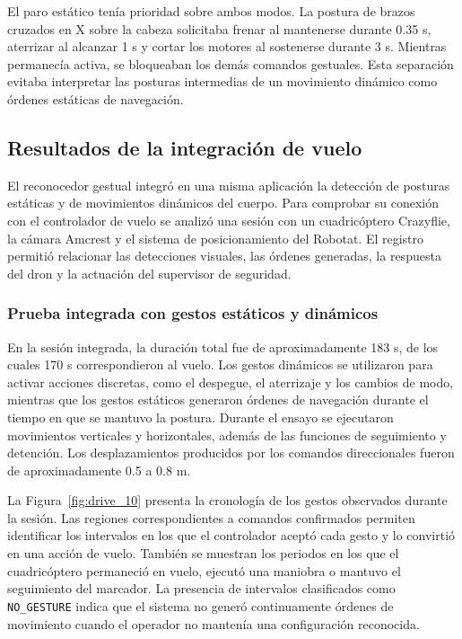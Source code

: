 El paro estático tenía prioridad sobre ambos modos. La postura de brazos cruzados en X sobre la cabeza solicitaba frenar al mantenerse durante 0.35 s, aterrizar al alcanzar 1 s y cortar los motores al sostenerse durante 3 s. Mientras permanecía activa, se bloqueaban los demás comandos gestuales. Esta separación evitaba interpretar las posturas intermedias de un movimiento dinámico como órdenes estáticas de navegación.

\subsection{Resultados de la integración de vuelo}

El reconocedor gestual integró en una misma aplicación la detección de posturas estáticas y de movimientos dinámicos del cuerpo. Para comprobar su conexión con el controlador de vuelo se analizó una sesión con un cuadricóptero Crazyflie, la cámara Amcrest y el sistema de posicionamiento del Robotat. El registro permitió relacionar las detecciones visuales, las órdenes generadas, la respuesta del dron y la actuación del supervisor de seguridad.

\subsubsection*{Prueba integrada con gestos estáticos y dinámicos}

En la sesión integrada, la duración total fue de aproximadamente 183 s, de los cuales 170 s correspondieron al vuelo. Los gestos dinámicos se utilizaron para activar acciones discretas, como el despegue, el aterrizaje y los cambios de modo, mientras que los gestos estáticos generaron órdenes de navegación durante el tiempo en que se mantuvo la postura. Durante el ensayo se ejecutaron movimientos verticales y horizontales, además de las funciones de seguimiento y detención. Los desplazamientos producidos por los comandos direccionales fueron de aproximadamente 0.5 a 0.8 m.

La Figura~\ref{fig:drive_10} presenta la cronología de los gestos observados durante la sesión. Las regiones correspondientes a comandos confirmados permiten identificar los intervalos en los que el controlador aceptó cada gesto y lo convirtió en una acción de vuelo. También se muestran los periodos en los que el cuadricóptero permaneció en vuelo, ejecutó una maniobra o mantuvo el seguimiento del marcador. La presencia de intervalos clasificados como \texttt{NO\_GESTURE} indica que el sistema no generó continuamente órdenes de movimiento cuando el operador no mantenía una configuración reconocida.

